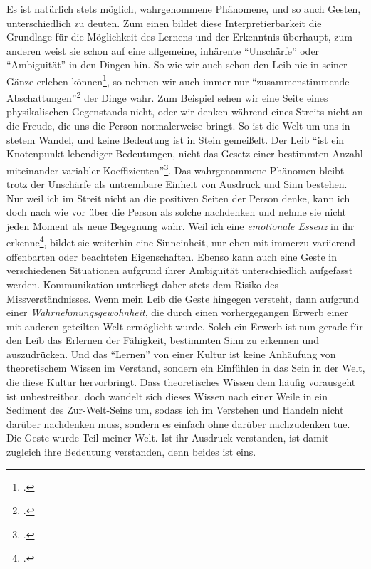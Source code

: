 \documentclass[a4paper, 12pt]{article}
\begin{document}
\begin{onehalfspace}
Es ist natürlich stets möglich, wahrgenommene Phänomene, und so auch Gesten, unterschiedlich zu deuten. Zum einen bildet diese Interpretierbarkeit die Grundlage für die Möglichkeit des Lernens und der Erkenntnis überhaupt, zum anderen weist sie schon auf eine allgemeine, inhärente "`Unschärfe"' oder "`Ambiguität"' in den Dingen hin. So wie wir auch schon den Leib nie in seiner Gänze erleben können\footnote{\Cite[Vgl.][S. ???]{merleau1966phanomenologie}.}, so nehmen wir auch immer nur "`zusammenstimmende Abschattungen"'\footnote{\Cite[Siehe][S. 220]{merleau1966phanomenologie}.} der Dinge wahr. Zum Beispiel sehen wir eine Seite eines physikalischen Gegenstands nicht, oder wir denken während eines Streits nicht an die Freude, die uns die Person normalerweise bringt. So ist die Welt um uns in stetem Wandel, und keine Bedeutung ist in Stein gemeißelt. Der Leib "`ist ein Knotenpunkt lebendiger Bedeutungen, nicht das Gesetz einer bestimmten Anzahl miteinander variabler Koeffizienten"'\footnote{\Cite[Siehe][S. 182]{merleau1966phanomenologie}.}. Das wahrgenommene Phänomen bleibt trotz der Unschärfe als untrennbare Einheit von Ausdruck und Sinn bestehen. Nur weil ich im Streit nicht an die positiven Seiten der Person denke, kann ich doch nach wie vor über die Person als solche nachdenken und nehme sie nicht jeden Moment als neue Begegnung wahr. Weil ich eine \emph{emotionale Essenz} in ihr erkenne\footnote{\Cite[Vgl.][S. 222]{merleau1966phanomenologie}.}, bildet sie weiterhin eine Sinneinheit, nur eben mit immerzu variierend offenbarten oder beachteten Eigenschaften. Ebenso kann auch eine Geste in verschiedenen Situationen aufgrund ihrer Ambiguität unterschiedlich aufgefasst werden. Kommunikation unterliegt daher stets dem Risiko des Missverständnisses. Wenn mein Leib die Geste hingegen versteht, dann aufgrund einer \emph{Wahrnehmungsgewohnheit}, die durch einen vorhergegangen Erwerb einer mit anderen geteilten Welt ermöglicht wurde. Solch ein Erwerb ist nun gerade für den Leib das Erlernen der Fähigkeit, bestimmten Sinn zu erkennen und auszudrücken. Und das "`Lernen"' von einer Kultur ist keine Anhäufung von theoretischem Wissen im Verstand, sondern ein Einfühlen in das Sein in der Welt, die diese Kultur hervorbringt. Dass theoretisches Wissen dem häufig vorausgeht ist unbestreitbar, doch wandelt sich dieses Wissen nach einer Weile in ein Sediment des Zur-Welt-Seins um, sodass ich im Verstehen und Handeln nicht darüber nachdenken muss, sondern es einfach ohne darüber nachzudenken tue. Die Geste wurde Teil meiner Welt. Ist ihr Ausdruck verstanden, ist damit zugleich ihre Bedeutung verstanden, denn beides ist eins.


\end{onehalfspace}
\end{document}
